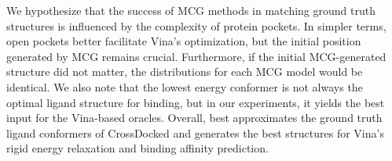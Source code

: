 We hypothesize that the success of MCG methods in matching ground truth structures is influenced by the complexity of protein pockets. In simpler terms, open pockets better facilitate Vina's optimization, but the initial position generated by MCG remains crucial.
Furthermore, if the initial MCG-generated structure did not matter, the distributions for each MCG model would be identical.
We also note that the lowest energy conformer is not always the optimal ligand structure for binding, but in our experiments, it yields the best input for the Vina-based oracles. 
Overall, \model best approximates the ground truth ligand conformers of CrossDocked and generates the best structures for Vina's rigid energy relaxation and binding affinity prediction.





